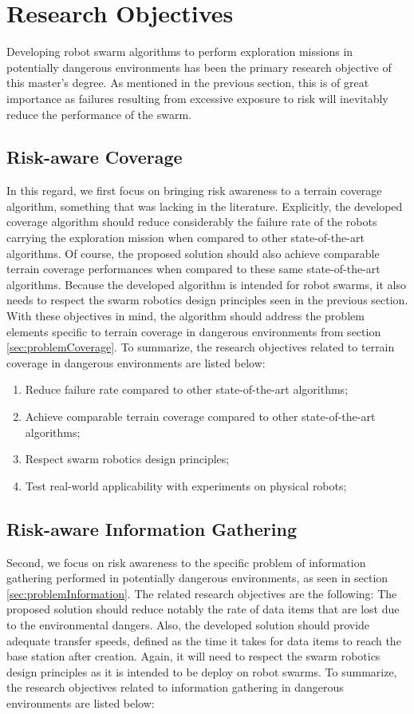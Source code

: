 \section{Research Objectives} 
\label{sec:objectifs}

Developing robot swarm algorithms to perform exploration missions in potentially dangerous environments has been the primary research objective of this master's degree. As mentioned in the previous section, this is of great importance as failures resulting from excessive exposure to risk will inevitably reduce the performance of the swarm. 

\subsection{Risk-aware Coverage}
In this regard, we first focus on bringing risk awareness to a terrain coverage algorithm, something that was lacking in the literature. Explicitly, the developed coverage algorithm should reduce considerably the failure rate of the robots carrying the exploration mission when compared to other state-of-the-art algorithms. Of course, the proposed solution should also achieve comparable terrain coverage performances when compared to these same state-of-the-art algorithms. Because the developed algorithm is intended for robot swarms, it also needs to respect the swarm robotics design principles seen in the previous section. With these objectives in mind, the algorithm should address the problem elements specific to terrain coverage in dangerous environments from section \ref{sec:problemCoverage}. To summarize, the research objectives related to terrain coverage in dangerous environments are listed below:

\begin{enumerate}
    \item Reduce failure rate compared to other state-of-the-art algorithms;
    \item Achieve comparable terrain coverage compared to other state-of-the-art algorithms;
    \item Respect swarm robotics design principles;
    \item Test real-world applicability with experiments on physical robots;
\end{enumerate}


\subsection{Risk-aware Information Gathering}
Second, we focus on risk awareness to the specific problem of information gathering performed in potentially dangerous environments, as seen in section \ref{sec:problemInformation}. The related research objectives are the following: The proposed solution should reduce notably the rate of data items that are lost due to the environmental dangers. Also, the developed solution should provide adequate transfer speeds, defined as the time it takes for data items to reach the base station after creation. Again, it will need to respect the swarm robotics design principles as it is intended to be deploy on robot swarms. To summarize, the research objectives related to information gathering in dangerous environments are listed below:

